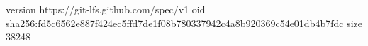 version https://git-lfs.github.com/spec/v1
oid sha256:fd5c6562e887f424ec5ffd7de1f08b780337942c4a8b920369c54e01db4b7fdc
size 38248
